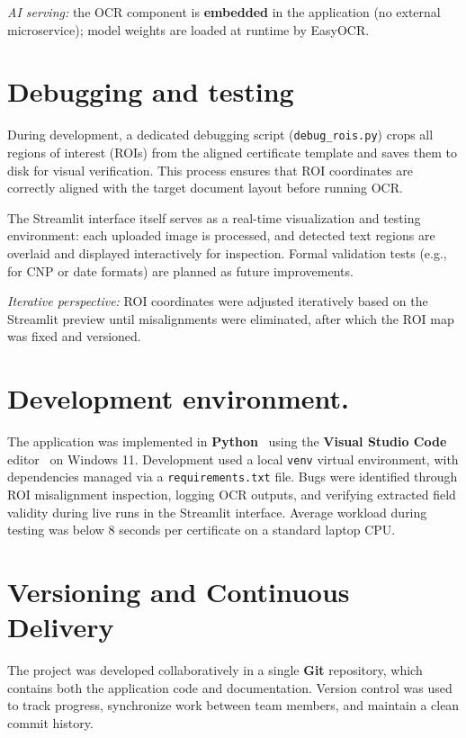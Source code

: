 \documentclass[runningheads,a4paper,11pt]{report}
\begin{document}
\noindent \textit{AI serving:} the OCR component is \textbf{embedded} in the application (no external microservice); model weights are loaded at runtime by EasyOCR.


\section{Debugging and testing}
During development, a dedicated debugging script (\texttt{debug\_rois.py}) crops all regions of interest (ROIs) from the aligned certificate template and saves them to disk for visual verification.  
This process ensures that ROI coordinates are correctly aligned with the target document layout before running OCR.  

The Streamlit interface itself serves as a real-time visualization and testing environment: each uploaded image is processed, and detected text regions are overlaid and displayed interactively for inspection.  
Formal validation tests (e.g., for CNP or date formats) are planned as future improvements.

\noindent \textit{Iterative perspective:} ROI coordinates were adjusted iteratively based on the Streamlit preview until misalignments were eliminated, after which the ROI map was fixed and versioned.


\section{Development environment.}
The application was implemented in \textbf{Python}~\cite{PythonSoftwareFoundation2024} using the \textbf{Visual Studio Code} editor~\cite{VSCode2024} on Windows 11.  
Development used a local \texttt{venv} virtual environment, with dependencies managed via a \texttt{requirements.txt} file.  
Bugs were identified through ROI misalignment inspection, logging OCR outputs, and verifying extracted field validity during live runs in the Streamlit interface.  
Average workload during testing was below 8 seconds per certificate on a standard laptop CPU.

\section{Versioning and Continuous Delivery}

The project was developed collaboratively in a single \textbf{Git} repository, which contains both the application code and documentation.  
Version control was used to track progress, synchronize work between team members, and maintain a clean commit history.  
\end{document}
